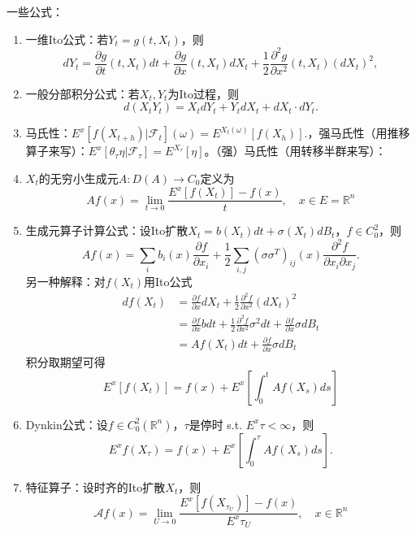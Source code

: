 一些公式：
\begin{enumerate}
  \item 一维Ito公式：若$Y_t = g(t, X_t)$，则
  \[
    d Y_{t}=\frac{\partial g}{\partial t}\left(t, X_{t}\right) d t+\frac{\partial g}{\partial x}\left(t, X_{t}\right) d X_{t}+\frac{1}{2} \frac{\partial^{2} g}{\partial x^{2}}\left(t, X_{t}\right)\left(d X_{t}\right)^{2},
  \]
  \item 一般分部积分公式：若$X_t, Y_t$为Ito过程，则
  \[
    d\left(X_{t} Y_{t}\right)=X_{t} d Y_{t}+Y_{t} d X_{t}+d X_{t} \cdot d Y_{t}.
  \]
  \item 马氏性：$E^{x}\left[f\left(X_{t+h}\right) | \mathcal{F}_{t}\right](\omega)=E^{X_{t}(\omega)}\left[f\left(X_{h}\right)\right].$，强马氏性（用推移算子来写）：$E^{x}\left[\theta_{\tau} \eta | \mathcal{F}_{\tau}\right]=E^{X_{\tau}}[\eta]$。（强）马氏性（用转移半群来写）：
  \item $X_{t}$的无穷小生成元$A: D(A) \to C_0$定义为
  \[
    A f(x)=\lim _{t \rightarrow 0} \frac{E^{x}\left[f\left(X_{t}\right)\right]-f(x)}{t}, \quad x \in E = \mathbb{R}^{n}
  \]
  \item 生成元算子计算公式：设Ito扩散$X_t = b(X_t)dt + \sigma(X_t)dB_t$，$f \in C_0^2$，则
  \[
    A f(x)=\sum_{i} b_{i}(x) \frac{\partial f}{\partial x_{i}}+\frac{1}{2} \sum_{i, j}\left(\sigma \sigma^{T}\right)_{i j}(x) \frac{\partial^{2} f}{\partial x_{i} \partial x_{j}}.
  \]
  另一种解释：对$f(X_t)$用Ito公式
  \[
    \begin{aligned}
      df(X_t) &= \frac{\partial f}{\partial x} dX_t + \frac{1}{2} \frac{\partial^2 f}{\partial x^2} (dX_t)^2\\
      &= \frac{\partial f}{\partial x} bdt + \frac{1}{2} \frac{\partial^2 f}{\partial x^2} \sigma^2 dt + \frac{\partial f}{\partial x} \sigma dB_t\\
      &= Af(X_t) dt + \frac{\partial f}{\partial x} \sigma dB_t
    \end{aligned}
  \]
  积分取期望可得
  \[
    E^x[f(X_t)] = f(x) + E^x\left[ \int_0^t Af(X_s) ds \right]
  \]
  \item Dynkin公式：设$f \in C_{0}^{2}\left(\mathbb{R}^{n}\right)$，$\tau$是停时 s.t. $E^{x} \tau<\infty$，则
  \[
    E^{x} f(X_{\tau})=f(x)+E^{x}\left[\int_{0}^{\tau} A f\left(X_{s}\right) d s\right] .
  \]
  \item 特征算子：设时齐的Ito扩散$X_{t}$，则
  \[
    \mathcal{A} f(x)=\lim_{U \rightarrow 0} \frac{E^{x}\left[f\left(X_{\tau_U}\right)\right]-f(x)}{E^x \tau_U}, \quad x \in \mathbb{R}^{n}
  \]
\end{enumerate}


